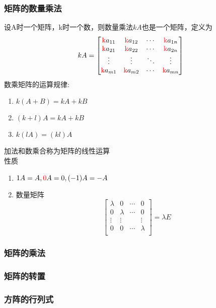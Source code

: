 \subsubsection{矩阵的数量乘法}
设A时一个矩阵，k时一个数，则数量乘法$kA$也是一个矩阵，定义为
$$kA=
\left[ \begin{matrix}
    \text{{\color{red}k}}{{a}_{11}} & \text{{\color{red}k}}{{a}_{12}} & \cdots  & \text{{\color{red}k}}{{a}_{1n}}  \\
    \text{{\color{red}k}}{{a}_{21}} & \text{{\color{red}k}}{{a}_{22}} & \cdots  & \text{{\color{red}k}}{{a}_{2n}}  \\
    \vdots  & \vdots  & {\ddots} & \vdots   \\
    \text{{\color{red}k}}{{a}_{m1}} & \text{{\color{red}k}}{{a}_{m2}} & \cdots  & \text{{\color{red}k}}{{a}_{mn}}  \\   
\end{matrix} \right]
$$
数乘矩阵的运算规律:\\
\begin{enumerate}
    \item{
        $k(A+B)=kA+kB$
    }
    \item{
        $(k+l)A=kA+kB$
    }
    \item{
        $k(lA)=(kl)A$
    }
\end{enumerate}
加法和数乘合称为矩阵的{\color{blue}线性运算}\\
{\color{blue}性质}
\begin{enumerate}
    \item{
        $1A=A,{\color{red}0}A=0,(-1)A=-A$
    }
    \item{
        数量矩阵
        $$
        \left[ \begin{matrix}
            \lambda  & 0 & \cdots  & 0  \\
            0 & \lambda  & \cdots  & 0  \\
            \vdots  & \vdots  & {} & \vdots   \\
            0 & 0 & \cdots  & \lambda   \\         
        \end{matrix} \right]=\lambda E
        $$
    }
\end{enumerate}
\subsubsection{矩阵的乘法}
\subsubsection{矩阵的转置}
\subsubsection{方阵的行列式}
